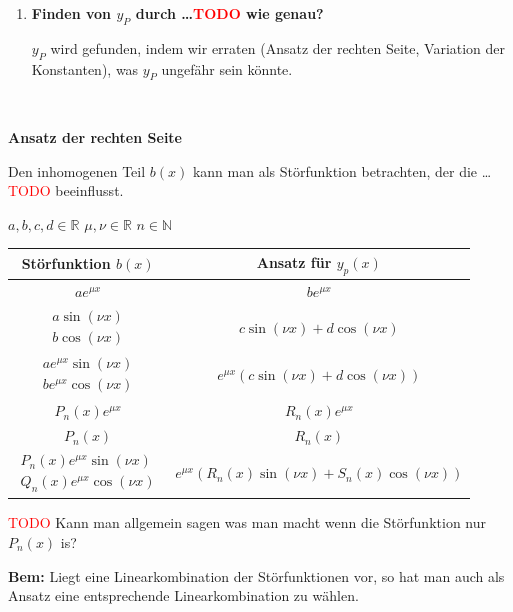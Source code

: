 \documentclass[a4paper,landscape,8pt]{extarticle}
\newcommand{\N}{\mathbb{N}}
\newcommand{\R}{\mathbb{R}}
\newcommand{\todo}{\textcolor{red}{TODO }}
\newcommand{\Bem}{\textbf{Bem: }}
\renewcommand*{\newpage}{ \ }
\begin{document}
\begin{multicols*}{4}
\begin{warmup}
\begin{warmup}
\begin{enumerate}[label=(\arabic*)]
  \todo Schreiben wie wir $y$ in eine Form ohne $i$ bringen mithilfe des
  Satzes der sagt, dass $i$ verschwinden muss. So etwas ähnliches wie die DGL
  hat nur relle Koeffizienten, also muss es auch $y_h$ haben\ldots
  
  Damit haben wir nun $y_h$ endgültig bestimmt.
  
\item \textbf{Finden von $y_P$ durch  \ldots \todo wie genau?}

  $y_P$ wird gefunden, indem wir erraten (Ansatz der rechten Seite, Variation
  der Konstanten), was $y_P$ ungefähr sein könnte.
\end{enumerate}
  
\newpage

\textbf{Ansatz der rechten Seite}

Den inhomogenen Teil $b(x)$ kann man als Störfunktion betrachten, der die
\ldots \todo beeinflusst.

$a,b,c,d\in \R$ \quad $\mu,\nu\in\R$ \quad $n\in \N$

\begin{tabular}{cc}
\toprule
\textbf{Störfunktion} $b(x)$ & \textbf{Ansatz für} $y_p(x)$\\
\midrule
$ae^{\mu x}$ & $be^{\mu x}$
\\
\hline
$\begin{matrix}
a\sin(\nu x)\\
b\cos(\nu x)
\end{matrix}$
& $c\sin(\nu x) + d \cos(\nu x)$
\\
\hline
$\begin{matrix}
ae^{\mu x}\sin(\nu x)\\
be^{\mu x}\cos(\nu x)
\end{matrix}$
&
$e^{\mu x}(c\sin(\nu x) + d\cos(\nu x))$
\\
\hline
$P_n(x)e^{\mu x}$ & $R_n(x)e^{\mu x}$
\\
\hline
$P_n(x)$ & $R_n(x)$
\\
\hline
$\begin{matrix}
P_n(x)e^{\mu x}\sin(\nu x)\\
Q_n(x)e^{\mu x}\cos(\nu x)
\end{matrix}$
&
$e^{\mu x}\left(
R_n(x)\sin(\nu x) +
S_n(x)\cos(\nu x)
\right)$\\
\bottomrule
\end{tabular}

\todo Kann man allgemein sagen was man macht wenn die Störfunktion nur $P_n(x)$
is?

\Bem Liegt eine Linearkombination der Störfunktionen vor, so hat man auch als
Ansatz eine entsprechende Linearkombination zu wählen.


\end{warmup}
\end{warmup}
\end{multicols*}
\end{document}
